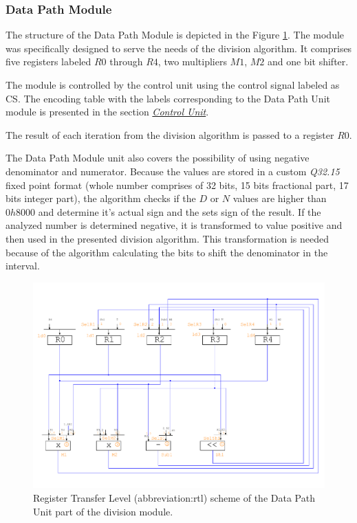 \documentclass[a4paper, twoside, 11pt]{article}
\begin{document}
\subsubsection{Data Path Module}
The structure of the Data Path Module is depicted in the Figure \ref{fig:division-rtl}. The module was specifically designed to serve the needs of the division algorithm. It comprises five registers labeled $R0$ through $R4$, two multipliers $M1$, $M2$ and one bit shifter.\par
The module is controlled by the control unit using the control signal labeled as CS. The encoding table with the labels corresponding to the Data Path Unit module is presented in the section \hyperref[subsubsec:division-control-unit]{\textit{Control Unit}}.\par
The result of each iteration from the division algorithm is passed to a register $R0$.\par
The Data Path Module unit also covers the possibility of using negative denominator and numerator. Because the values are stored in a custom \textit{Q32.15} fixed point format (whole number comprises of 32 bits, 15 bits fractional part, 17 bits integer part), the algorithm checks if the $D$ or $N$ values are higher than $0h8000$ and determine it's actual sign and the sets sign of the result. If the analyzed number is determined negative, it is transformed to value positive and then used in the presented division algorithm. This transformation is needed because of the algorithm calculating the bits to shift the denominator in the interval.
\begin{figure}[htbp!]
  \centering
  \includegraphics[width=1\textwidth]{src/pdf/rtl.pdf}
    \caption{Register Transfer Level (\gls{abbreviation:rtl}) scheme of the Data Path Unit part of the division module.}
  \label{fig:division-rtl}
\end{figure}
\end{document}
